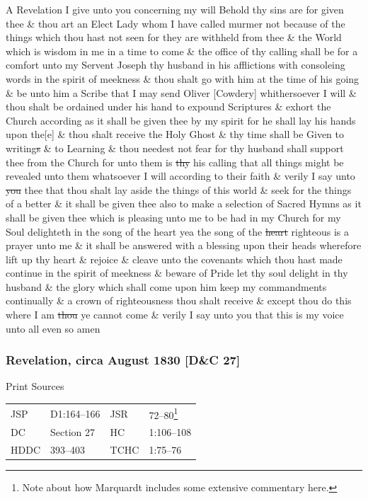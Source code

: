 				A Revelation I give unto you concerning my will Behold thy sins are for given thee \& thou art an Elect Lady whom I have called murmer not because of the things which thou hast not seen for they are withheld from thee \& the World which is wisdom in me in a time to come \& the office of thy calling shall be for a comfort unto my Servent Joseph thy husband in his afflictions with consoleing words in the spirit of meekness \& thou shalt go with him at the time of his going \& be unto him a Scribe that I may send Oliver [Cowdery] whithersoever I will \& thou shalt be ordained under his hand to expound Scriptures \& exhort the Church according as it shall be given thee by my spirit for he shall lay his hands upon the[e] \& thou shalt receive the Holy Ghost \& thy time shall be Given to writing\sout{s} \& to Learning \& thou needest not fear for thy husband shall support thee from the Church for unto them is \sout{thy} his calling that all things might be revealed unto them whatsoever I will according to their faith \& verily I say unto \sout{you} thee that thou shalt lay aside the things of this world \& seek for the things of a better \& it shall be given thee also to make a selection of Sacred Hymns as it shall be given thee which is pleasing unto me to be had in my Church for my Soul delighteth in the song of the heart yea the song of the \sout{heart} righteous is a prayer unto me \& it shall be answered with a blessing upon their heads wherefore lift up thy heart \& rejoice \& cleave unto the covenants which thou hast made continue in the spirit of meekness \& beware of Pride let thy soul delight in thy husband \& the glory which shall come upon him keep my commandments continually \& a crown of righteousness thou shalt receive \& except thou do this where I am \sout{thou} ye cannot come \& verily I say unto you that this is my voice unto all even so amen
				
		\subsubsection{Revelation, circa August 1830 [D\&C 27]}
			\label{EMS-1830-JS-CIR-AUG-1830}
		
			\begin{description}
				\item[Print Sources]
			\end{description}

				\begin{tabular}{p{0.5in}p{1in}p{0.5in}p{1in}}
				JSP	 	& D1:164--166	& JSR 		& 72--80\footnote{Note about how Marquardt includes some extensive commentary here.} \\
				DC	 	& Section 27	& HC 		& 1:106--108 \\
				HDDC 	& 393--403		& TCHC 		& 1:75--76 \\
				\end{tabular}
			
